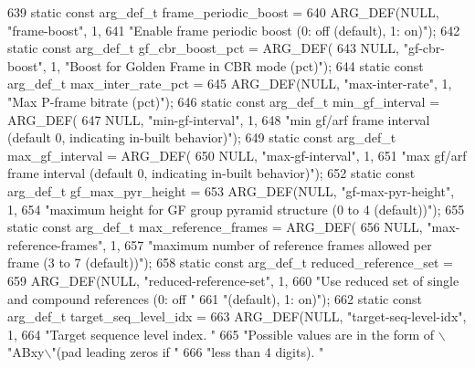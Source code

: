 \begin{DoxyCodeInclude}
{{{{{{{639 \textcolor{keyword}{static} \textcolor{keyword}{const} arg\_def\_t frame\_periodic\_boost =
640     ARG\_DEF(NULL, \textcolor{stringliteral}{"frame-boost"}, 1,
641             \textcolor{stringliteral}{"Enable frame periodic boost (0: off (default), 1: on)"});
642 \textcolor{keyword}{static} \textcolor{keyword}{const} arg\_def\_t gf\_cbr\_boost\_pct = ARG\_DEF(
643     NULL, \textcolor{stringliteral}{"gf-cbr-boost"}, 1, \textcolor{stringliteral}{"Boost for Golden Frame in CBR mode (pct)"});
644 \textcolor{keyword}{static} \textcolor{keyword}{const} arg\_def\_t max\_inter\_rate\_pct =
645     ARG\_DEF(NULL, \textcolor{stringliteral}{"max-inter-rate"}, 1, \textcolor{stringliteral}{"Max P-frame bitrate (pct)"});
646 \textcolor{keyword}{static} \textcolor{keyword}{const} arg\_def\_t min\_gf\_interval = ARG\_DEF(
647     NULL, \textcolor{stringliteral}{"min-gf-interval"}, 1,
648     \textcolor{stringliteral}{"min gf/arf frame interval (default 0, indicating in-built behavior)"});
649 \textcolor{keyword}{static} \textcolor{keyword}{const} arg\_def\_t max\_gf\_interval = ARG\_DEF(
650     NULL, \textcolor{stringliteral}{"max-gf-interval"}, 1,
651     \textcolor{stringliteral}{"max gf/arf frame interval (default 0, indicating in-built behavior)"});
652 \textcolor{keyword}{static} \textcolor{keyword}{const} arg\_def\_t gf\_max\_pyr\_height =
653     ARG\_DEF(NULL, \textcolor{stringliteral}{"gf-max-pyr-height"}, 1,
654             \textcolor{stringliteral}{"maximum height for GF group pyramid structure (0 to 4 (default))"});
655 \textcolor{keyword}{static} \textcolor{keyword}{const} arg\_def\_t max\_reference\_frames = ARG\_DEF(
656     NULL, \textcolor{stringliteral}{"max-reference-frames"}, 1,
657     \textcolor{stringliteral}{"maximum number of reference frames allowed per frame (3 to 7 (default))"});
658 \textcolor{keyword}{static} \textcolor{keyword}{const} arg\_def\_t reduced\_reference\_set =
659     ARG\_DEF(NULL, \textcolor{stringliteral}{"reduced-reference-set"}, 1,
660             \textcolor{stringliteral}{"Use reduced set of single and compound references (0: off "}
661             \textcolor{stringliteral}{"(default), 1: on)"});
662 \textcolor{keyword}{static} \textcolor{keyword}{const} arg\_def\_t target\_seq\_level\_idx =
663     ARG\_DEF(NULL, \textcolor{stringliteral}{"target-seq-level-idx"}, 1,
664             \textcolor{stringliteral}{"Target sequence level index. "}
665             \textcolor{stringliteral}{"Possible values are in the form of \(\backslash\)"ABxy\(\backslash\)"(pad leading zeros if "}
666             \textcolor{stringliteral}{"less than 4 digits). "}
}}}}}}}
\end{DoxyCodeInclude}
